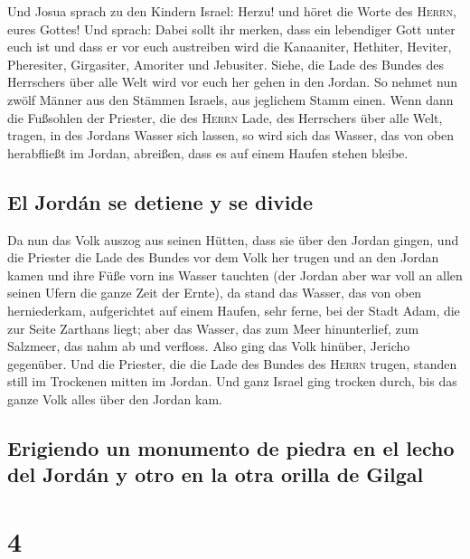  Und Josua sprach zu den Kindern Israel: Herzu! und höret
die Worte des \textsc{Herrn}, eures Gottes!  Und sprach:
Dabei sollt ihr merken, dass ein lebendiger Gott unter euch ist und dass
er vor euch austreiben wird die Kanaaniter, Hethiter, Heviter,
Pheresiter, Girgasiter, Amoriter und Jebusiter.  Siehe,
die Lade des Bundes des Herrschers über alle Welt wird vor euch her
gehen in den Jordan.  So nehmet nun zwölf Männer aus den
Stämmen Israels, aus jeglichem Stamm einen.  Wenn dann
die Fußsohlen der Priester, die des \textsc{Herrn} Lade, des Herrschers
über alle Welt, tragen, in des Jordans Wasser sich lassen, so wird sich
das Wasser, das von oben herabfließt im Jordan, abreißen, dass es auf
einem Haufen stehen bleibe.

\hypertarget{el-jorduxe1n-se-detiene-y-se-divide}{%
\subsection{El Jordán se detiene y se
divide}\label{el-jorduxe1n-se-detiene-y-se-divide}}

 Da nun das Volk auszog aus seinen Hütten, dass sie über
den Jordan gingen, und die Priester die Lade des Bundes vor dem Volk her
trugen  und an den Jordan kamen und ihre Füße vorn ins
Wasser tauchten (der Jordan aber war voll an allen seinen Ufern die
ganze Zeit der Ernte),  da stand das Wasser, das von oben
herniederkam, aufgerichtet auf einem Haufen, sehr ferne, bei der Stadt
Adam, die zur Seite Zarthans liegt; aber das Wasser, das zum Meer
hinunterlief, zum Salzmeer, das nahm ab und verfloss. Also ging das Volk
hinüber, Jericho gegenüber.  Und die Priester, die die
Lade des Bundes des \textsc{Herrn} trugen, standen still im Trockenen
mitten im Jordan. Und ganz Israel ging trocken durch, bis das ganze Volk
alles über den Jordan kam.

\hypertarget{erigiendo-un-monumento-de-piedra-en-el-lecho-del-jorduxe1n-y-otro-en-la-otra-orilla-de-gilgal}{%
\subsection{Erigiendo un monumento de piedra en el lecho del Jordán y
otro en la otra orilla de
Gilgal}\label{erigiendo-un-monumento-de-piedra-en-el-lecho-del-jorduxe1n-y-otro-en-la-otra-orilla-de-gilgal}}

\hypertarget{section-3}{%
\section{4}\label{section-3}}

